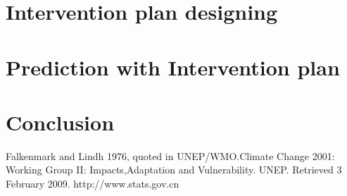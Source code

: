 \section{Intervention plan designing}

\section{Prediction with Intervention plan}

\section{Conclusion}


\begin{thebibliography}{99}
   {Falkenmark and Lindh 1976, quoted in UNEP/WMO.Climate Change 2001: Working Group II: Impacts,Adaptation and Vulnerability. UNEP. Retrieved 3 February 2009.}
   http://www.stats.gov.cn
\end{thebibliography}

